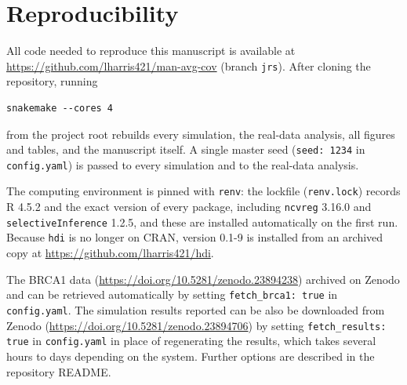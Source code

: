 \section{Reproducibility}

All code needed to reproduce this manuscript is available at \url{https://github.com/lharris421/man-avg-cov} (branch
\texttt{jrs}). After cloning the repository, running
\begin{verbatim}
snakemake --cores 4
\end{verbatim}
from the project root rebuilds every simulation, the real-data analysis, all figures and tables, and the manuscript itself. A single master seed (\texttt{seed: 1234} in \texttt{config.yaml}) is passed to every simulation and to the real-data analysis.

The computing environment is pinned with \texttt{renv}: the lockfile (\texttt{renv.lock}) records R 4.5.2 and the exact version of every package, including \texttt{ncvreg} 3.16.0 and \texttt{selectiveInference} 1.2.5, and these are installed automatically on the first run. Because \texttt{hdi} is no longer on CRAN, version 0.1-9 is installed from an archived copy at \url{https://github.com/lharris421/hdi}. 

The BRCA1 data (\url{https://doi.org/10.5281/zenodo.23894238}) archived on Zenodo and can be retrieved automatically by setting \texttt{fetch\_brca1: true} in \texttt{config.yaml}. The simulation results reported can be also be downloaded from Zenodo (\url{https://doi.org/10.5281/zenodo.23894706}) by setting \texttt{fetch\_results: true} in \texttt{config.yaml} in place of regenerating the results, which takes several hours to days depending on the system. Further options are described in the repository README.